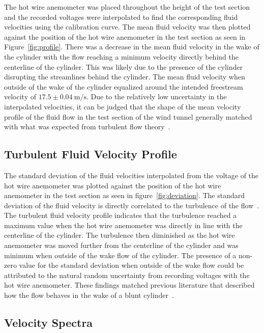 \documentclass[journal,letterpaper]{IEEEtran}
\begin{document}
The hot wire anemometer was placed throughout the height of the test section and the recorded voltages were interpolated to find the corresponding fluid velocities using the calibration curve.
The mean fluid velocity was then plotted against the position of the hot wire anemometer in the test section as seen in Figure~\ref{fig:profile}.
There was a decrease in the mean fluid velocity in the wake of the cylinder with the flow reaching a minimum velocity directly behind the centerline of the cylinder.
This was likely due to the presence of the cylinder disrupting the streamlines behind the cylinder.
The mean fluid velocity when outside of the wake of the cylinder equalized around the intended freestream velocity of $17.5 \pm \qty{0.04}{\m\per\s}$.
Due to the relatively low uncertainty in the interpolated velocities, it can be judged that the shape of the mean velocity profile of the fluid flow in the test section of the wind tunnel generally matched with what was expected from turbulent flow theory~\cite{lab3doc}.

\subsection{Turbulent Fluid Velocity Profile}

The standard deviation of the fluid velocities interpolated from the voltage of the hot wire anemometer was plotted against the position of the hot wire anemometer in the test section as seen in figure~\ref{fig:deviation}.
The standard deviation of the fluid velocity is directly correlated to the turbulence of the flow~\cite{turbulence}.
The turbulent fluid velocity profile indicates that the turbulence reached a maximum value when the hot wire anemometer was directly in line with the centerline of the cylinder.
The turbulence then diminished as the hot wire anemometer was moved further from the centerline of the cylinder and was minimum when outside of the wake flow of the cylinder.
The presence of a non-zero value for the standard deviation when outside of the wake flow could be attributed to the natural random uncertainty from recording voltages with the hot wire anemometer.
These findings matched previous literature that described how the flow behaves in the wake of a blunt cylinder~\cite{turbulence}.

\subsection{Velocity Spectra}
\end{document}
